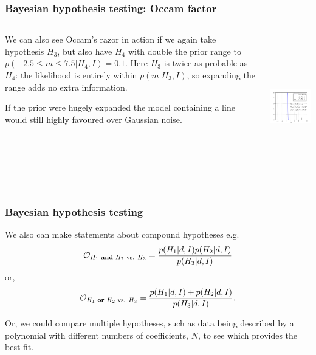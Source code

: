 \begin{frame}

\frametitle{Bayesian hypothesis testing: Occam factor}
\label{bayesianhypothesistesting:occamfactor}

\begin{columns}
     \begin{column}{0.525\textwidth}

We can also see Occam's razor in action if we again take hypothesis $H_3$, but also have $H_4$ with double
the prior range to $p(-2.5 \le m \le 7.5|H_4,I) = 0.1$. Here $H_3$ is twice as probable as $H_4$: the likelihood is entirely within $p(m|H_3,I)$, so expanding
the range adds no extra information.

If the prior were hugely expanded the model containing a line would still highly favoured over
Gaussian noise.

\end{column}
\begin{column}{0.475\textwidth}

\includegraphics[keepaspectratio,width=\textwidth,height=180pt]{figures/occam_factor.pdf}
\end{column}
\end{columns}

\end{frame}

\begin{frame}

\frametitle{Bayesian hypothesis testing}
\label{bayesianhypothesistesting}

We also can make statements about compound hypotheses e.g.
\[
\mathcal{O}_{H_1\text{ \textbf{and} }H_2 \text{ vs. }H_3} = \frac{p(H_1|d,I)p(H_2|d,I)}{p(H_3|d,I)}
\]
or,
\[
\mathcal{O}_{H_1\text{ \textbf{or} }H_2 \text{ vs. }H_3} = \frac{p(H_1|d,I) + p(H_2|d,I)}{p(H_3|d,I)}.
\]

Or, we could compare multiple hypotheses, such as data being described by a polynomial with different numbers
of coefficients, $N$, to see which provides the best fit.

\end{frame}

